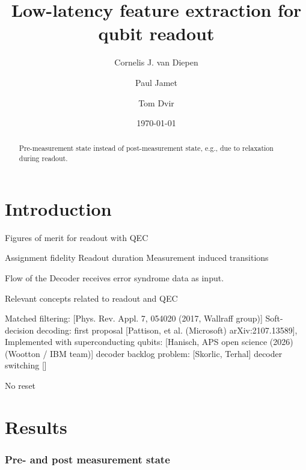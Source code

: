 \documentclass[aps,prx,twocolumn,longbibliography,nofootinbib,floatfix,superscriptaddress]{revtex4-2}
\begin{document}
\title{Low-latency feature extraction for qubit readout}

\author{Cornelis J. van Diepen}
\author{Paul Jamet}
\author{Tom Dvir}

\date{\today}

\begin{abstract}
    Pre-measurement state instead of post-measurement state, e.g., due to relaxation during readout. 
\end{abstract}

\maketitle

\section{Introduction}

Figures of merit for readout with QEC
\begin{outline}
    \1 Assignment fidelity
    \1 Readout duration
    \1 Measurement induced transitions
\end{outline}

Flow of the 
Decoder receives error syndrome data as input. 

Relevant concepts related to readout and QEC
\begin{outline}
    \1 Matched filtering: [Phys. Rev. Appl. 7, 054020 (2017, Wallraff group)]
    \1 Soft-decision decoding: 
        \2 first proposal [Pattison, et al. (Microsoft) arXiv:2107.13589], 
        \2 Implemented with superconducting qubits: [Hanisch, APS open science (2026) (Wootton / IBM team)]
    \1 decoder backlog problem: [Skorlic, Terhal]
    \1 decoder switching []
\end{outline}


No reset
\begin{outline}
	\1 \cite{Geher2025}
\end{outline}


\section{Results}

\subsubsection{Pre- and post measurement state}
\end{document}
